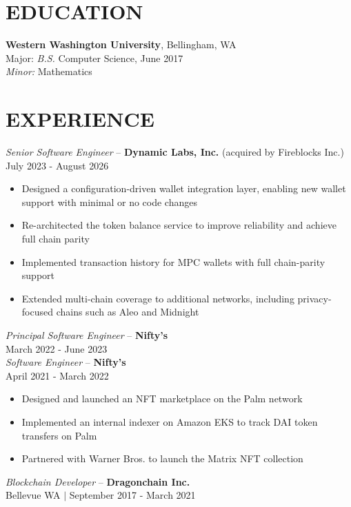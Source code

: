 \documentclass[line,margin]{res}
\begin{document}
\address{alex@alex-benedetto.com $|$ github.com/wolfpack94}

\begin{resume}

\section{EDUCATION}
	{\bf Western Washington University}, Bellingham, WA\\
	Major: {\sl B.S.} Computer Science, {\small June 2017}\\
	{\sl Minor:} Mathematics
\section{EXPERIENCE}
	{\sl Senior Software Engineer} -- {\bf Dynamic Labs, Inc.} (acquired by Fireblocks Inc.)\\
	{\footnotesize July 2023 - August 2026}
	\begin{itemize} \itemsep -2pt
		\item Designed a configuration-driven wallet integration layer, enabling new wallet support with minimal or no code changes
		\item Re-architected the token balance service to improve reliability and achieve full chain parity
		\item Implemented transaction history for MPC wallets with full chain-parity support
		\item Extended multi-chain coverage to additional networks, including privacy-focused chains such as Aleo and Midnight
	\end{itemize}
	{\sl Principal Software Engineer} -- {\bf Nifty's}\\
	{\footnotesize March 2022 - June 2023}\\
	{\sl Software Engineer} -- {\bf Nifty's}\\
	{\footnotesize April 2021 - March 2022}
	\begin{itemize} \itemsep -2pt
		\item Designed and launched an NFT marketplace on the Palm network
		\item Implemented an internal indexer on Amazon EKS to track DAI token transfers on Palm
		\item Partnered with Warner Bros. to launch the Matrix NFT collection
	\end{itemize}
	{\sl Blockchain Developer} -- {\bf Dragonchain Inc.}\\
	\footnotesize Bellevue WA $|$ September 2017 - March 2021

\end{resume}
\end{document}
